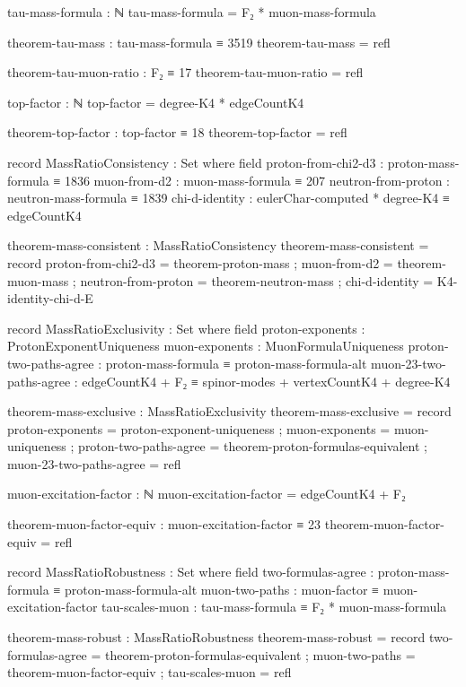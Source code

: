 \documentclass[11pt,a4paper]{book}
\begin{document}
\begin{code}
tau-mass-formula : ℕ
tau-mass-formula = F₂ * muon-mass-formula

theorem-tau-mass : tau-mass-formula ≡ 3519
theorem-tau-mass = refl

theorem-tau-muon-ratio : F₂ ≡ 17
theorem-tau-muon-ratio = refl

top-factor : ℕ
top-factor = degree-K4 * edgeCountK4

theorem-top-factor : top-factor ≡ 18
theorem-top-factor = refl

record MassRatioConsistency : Set where
  field
    proton-from-chi2-d3 : proton-mass-formula ≡ 1836
    muon-from-d2       : muon-mass-formula ≡ 207
    neutron-from-proton : neutron-mass-formula ≡ 1839
    chi-d-identity     : eulerChar-computed * degree-K4 ≡ edgeCountK4

theorem-mass-consistent : MassRatioConsistency
theorem-mass-consistent = record
  { proton-from-chi2-d3 = theorem-proton-mass
  ; muon-from-d2 = theorem-muon-mass
  ; neutron-from-proton = theorem-neutron-mass
  ; chi-d-identity = K4-identity-chi-d-E
  }

record MassRatioExclusivity : Set where
  field
    proton-exponents        : ProtonExponentUniqueness
    muon-exponents          : MuonFormulaUniqueness
    proton-two-paths-agree  : proton-mass-formula ≡ proton-mass-formula-alt
    muon-23-two-paths-agree : edgeCountK4 + F₂ ≡ spinor-modes + vertexCountK4 + degree-K4

theorem-mass-exclusive : MassRatioExclusivity
theorem-mass-exclusive = record
  { proton-exponents = proton-exponent-uniqueness
  ; muon-exponents = muon-uniqueness
  ; proton-two-paths-agree = theorem-proton-formulas-equivalent
  ; muon-23-two-paths-agree = refl
  }

muon-excitation-factor : ℕ
muon-excitation-factor = edgeCountK4 + F₂

theorem-muon-factor-equiv : muon-excitation-factor ≡ 23
theorem-muon-factor-equiv = refl

record MassRatioRobustness : Set where
  field
    two-formulas-agree : proton-mass-formula ≡ proton-mass-formula-alt
    muon-two-paths     : muon-factor ≡ muon-excitation-factor
    tau-scales-muon    : tau-mass-formula ≡ F₂ * muon-mass-formula

theorem-mass-robust : MassRatioRobustness
theorem-mass-robust = record
  { two-formulas-agree = theorem-proton-formulas-equivalent
  ; muon-two-paths = theorem-muon-factor-equiv
  ; tau-scales-muon = refl
  }


\end{code}
\end{document}
